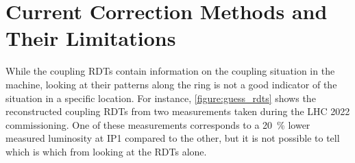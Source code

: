 
\section{Current Correction Methods and Their Limitations}
\label{section:current_correction_methods_and_their_limitations}

While the coupling RDTs contain information on the coupling situation in the machine, looking at their patterns along the ring is not a good indicator of the situation in a specific location.
For instance, \cref{figure:guess_rdts} shows the reconstructed coupling RDTs from two measurements taken during the LHC \num{2022} commissioning.
One of these measurements corresponds to a \qty{20}{\percent} lower measured luminosity at IP\num{1} compared to the other, but it is not possible to tell which is which from looking at the RDTs alone.

